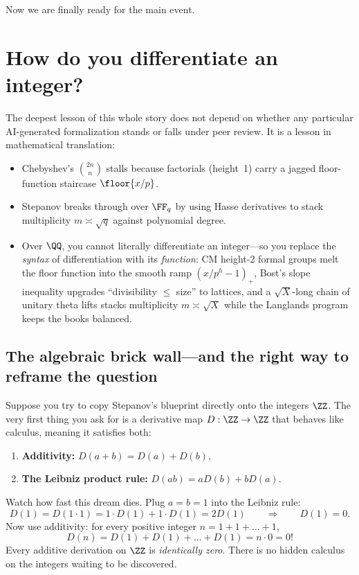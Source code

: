 Now we are finally ready for the main event.

\section{How do you differentiate an integer?}

The deepest lesson of this whole story does not depend on whether any particular AI-generated formalization stands or falls under peer review. It is a lesson in mathematical translation:
\begin{itemize}
  \item Chebyshev's \(\binom{2n}{n}\) stalls because factorials (height~1) carry a jagged floor-function staircase \(\floor{x/p}\).
  \item Stepanov breaks through over \(\FF_q\) by using Hasse derivatives to stack multiplicity \(m \asymp \sqrt{q}\) against polynomial degree.
  \item Over \(\QQ\), you cannot literally differentiate an integer---so you replace the \emph{syntax} of differentiation with its \emph{function}: CM height-2 formal groups melt the floor function into the smooth ramp \((x/p^h - 1)_+\), Bost's slope inequality upgrades ``divisibility \(\le\) size'' to lattices, and a \(\sqrt{X}\)-long chain of unitary theta lifts stacks multiplicity \(m \asymp \sqrt{X}\) while the Langlands program keeps the books balanced.
\end{itemize}

\subsection{The algebraic brick wall---and the right way to reframe the question}

Suppose you try to copy Stepanov's blueprint directly onto the integers \(\ZZ\). The very first thing you ask for is a derivative map \(D : \ZZ \to \ZZ\) that behaves like calculus, meaning it satisfies both:
\begin{enumerate}
  \item \textbf{Additivity:} \(D(a + b) = D(a) + D(b)\),
  \item \textbf{The Leibniz product rule:} \(D(ab) = a D(b) + b D(a)\).
\end{enumerate}
Watch how fast this dream dies. Plug \(a = b = 1\) into the Leibniz rule:
\[
  D(1) = D(1 \cdot 1) = 1 \cdot D(1) + 1 \cdot D(1) = 2 D(1)
  \qquad \Longrightarrow \qquad
  D(1) = 0.
\]
Now use additivity: for every positive integer \(n = 1 + 1 + \dots + 1\),
\[
  D(n) = D(1) + D(1) + \dots + D(1) = n \cdot 0 = 0!
\]
Every additive derivation on \(\ZZ\) is \emph{identically zero}. There is no hidden calculus on the integers waiting to be discovered.

